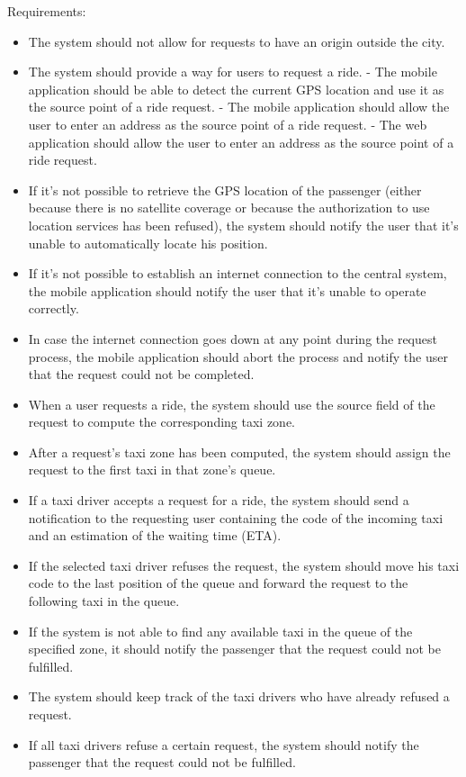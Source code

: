 Requirements:
\begin{itemize}
\item The system should not allow for requests to have an origin outside the city. 
\item The system should provide a way for users to request a ride.
	- The mobile application should be able to detect the current GPS location and use it as the source point of a ride request.
	- The mobile application should allow the user to enter an address as the source point of a ride request.
	- The web application should allow the user to enter an address as the source point of a ride request.
\item If it’s not possible to retrieve the GPS location of the passenger (either because there is no satellite coverage or because the authorization to use location services has been refused), the system should notify the user that it’s unable to automatically locate his position.
\item If it’s not possible to establish an internet connection to the central system, the mobile application should notify the user that it’s unable to operate correctly.
\item In case the internet connection goes down at any point during the request process, the mobile application should abort the process and notify the user that the request could not be completed.
\item When a user requests a ride, the system should use the source field of the request to compute the corresponding taxi zone. 
\item After a request’s taxi zone has been computed, the system should assign the request to the first taxi in that zone’s queue.
\item If a taxi driver accepts a request for a ride, the system should send a notification to the requesting user containing the code of the incoming taxi and an estimation of the waiting time (ETA).
\item If the selected taxi driver refuses the request, the system should move his taxi code to the last position of the queue and forward the request to the following taxi in the queue.
\item If the system is not able to find any available taxi in the queue of the specified zone, it should notify the passenger that the request could not be fulfilled. 
\item The system should keep track of the taxi drivers who have already refused a request.
\item If all taxi drivers refuse a certain request, the system should notify the passenger that the request could not be fulfilled.
\end{itemize}

